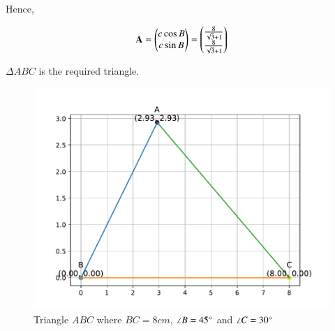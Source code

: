 \documentclass[journal]{IEEEtran}
\begin{document}
Hence,

\begin{align}
    \mathbf{A} = \begin{pmatrix}c\cos B \\ c\sin B\end{pmatrix} = \begin{pmatrix}\frac{8}{\sqrt{3} + 1} \\ \frac{8}{\sqrt{3} + 1}\end{pmatrix}
\end{align}

$\Delta ABC$ is the required triangle.

\begin{figure}[h!]
    \centering
    \includegraphics[width=0.7\linewidth]{figs/fig.pdf}
    \caption{Triangle $ABC$ where $BC=8cm$, $\angle B = 45 \degree$ and $\angle C = 30 \degree$}
\end{figure}
\end{document}
